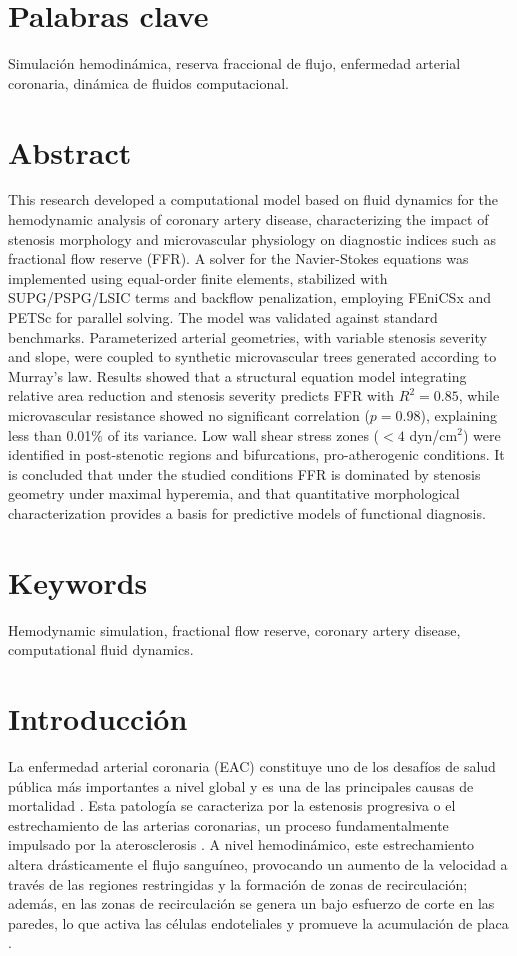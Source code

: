 \documentclass[12pt, letterpaper]{article}
\begin{document}
\section*{Palabras clave}
Simulación hemodinámica, reserva fraccional de flujo, enfermedad arterial coronaria, dinámica de fluidos computacional.

\section*{Abstract}
This research developed a computational model based on fluid dynamics for the hemodynamic analysis of coronary artery disease, characterizing the impact of stenosis morphology and microvascular physiology on diagnostic indices such as fractional flow reserve (FFR). A solver for the Navier-Stokes equations was implemented using equal-order finite elements, stabilized with SUPG/PSPG/LSIC terms and backflow penalization, employing FEniCSx and PETSc for parallel solving. The model was validated against standard benchmarks. Parameterized arterial geometries, with variable stenosis severity and slope, were coupled to synthetic microvascular trees generated according to Murray's law. Results showed that a structural equation model integrating relative area reduction and stenosis severity predicts FFR with $R^2=0.85$, while microvascular resistance showed no significant correlation ($p=0.98$), explaining less than 0.01\% of its variance. Low wall shear stress zones ($<4$ dyn/cm$^2$) were identified in post-stenotic regions and bifurcations, pro-atherogenic conditions. It is concluded that under the studied conditions FFR is dominated by stenosis geometry under maximal hyperemia, and that quantitative morphological characterization provides a basis for predictive models of functional diagnosis.

\section*{Keywords}
Hemodynamic simulation, fractional flow reserve, coronary artery disease, computational fluid dynamics.

\newpage
{}
\tableofcontents
\newpage

\section{Introducción}
La enfermedad arterial coronaria (EAC) constituye uno de los desafíos de salud pública más importantes a nivel global y es una de las principales causas de mortalidad \cite{world_health_organization_cardiovascular_2021}. Esta patología se caracteriza por la estenosis progresiva o el estrechamiento de las arterias coronarias, un proceso fundamentalmente impulsado por la aterosclerosis \cite{knuuti_2019_2020}. A nivel hemodinámico, este estrechamiento altera drásticamente el flujo sanguíneo, provocando un aumento de la velocidad a través de las regiones restringidas y la formación de zonas de recirculación; además, en las zonas de recirculación se genera un bajo esfuerzo de corte en las paredes, lo que activa las células endoteliales y promueve la acumulación de placa \cite{malek_hemodynamic_1999,ku_blood_1997}.
\end{document}

